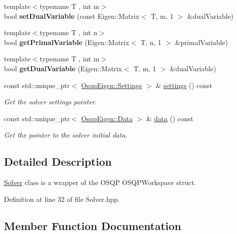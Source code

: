 \begin{DoxyCompactItemize}
\item 
\mbox{\label{classOsqpEigen_1_1Solver_a18059c9138e3ce633ea71ea7a7b3d1e2}} 
{\footnotesize template$<$typename T , int m$>$ }\\bool {\bfseries set\+Dual\+Variable} (const Eigen\+::\+Matrix$<$ T, m, 1 $>$ \&dual\+Variable)
\item 
\mbox{\label{classOsqpEigen_1_1Solver_a46445009598183b2887f81b4e9bb861f}} 
{\footnotesize template$<$typename T , int n$>$ }\\bool {\bfseries get\+Primal\+Variable} (Eigen\+::\+Matrix$<$ T, n, 1 $>$ \&primal\+Variable)
\item 
\mbox{\label{classOsqpEigen_1_1Solver_a0a7310947551c696e433819a9a11e503}} 
{\footnotesize template$<$typename T , int m$>$ }\\bool {\bfseries get\+Dual\+Variable} (Eigen\+::\+Matrix$<$ T, m, 1 $>$ \&dual\+Variable)
\item 
const std\+::unique\+\_\+ptr$<$ \mbox{\hyperlink{classOsqpEigen_1_1Settings}{Osqp\+Eigen\+::\+Settings}} $>$ \& \mbox{\hyperlink{classOsqpEigen_1_1Solver_ad355be214417b0ccb1ec54913fe378c4}{settings}} () const
\begin{DoxyCompactList}\small\item\em Get the solver settings pointer. \end{DoxyCompactList}\item 
const std\+::unique\+\_\+ptr$<$ \mbox{\hyperlink{classOsqpEigen_1_1Data}{Osqp\+Eigen\+::\+Data}} $>$ \& \mbox{\hyperlink{classOsqpEigen_1_1Solver_a2d93b3aae416bc29abe5fb1db16333e0}{data}} () const
\begin{DoxyCompactList}\small\item\em Get the pointer to the solver initial data. \end{DoxyCompactList}\end{DoxyCompactItemize}


\subsection{Detailed Description}
\mbox{\hyperlink{classOsqpEigen_1_1Solver}{Solver}} class is a wrapper of the O\+S\+QP O\+S\+Q\+P\+Workspace struct. 

Definition at line 32 of file Solver.\+hpp.



\subsection{Member Function Documentation}
\mbox{\label{classOsqpEigen_1_1Solver_a11605685ef645c991b1f7935d1b854f4}} 
